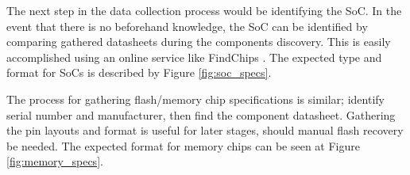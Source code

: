 






The next step in the data collection process would be identifying the SoC. In the event that there is no beforehand knowledge, the SoC can be identified by comparing gathered datasheets during the components discovery. This is easily accomplished using an online service like FindChips \autocite{FindchipsElectronicPart}. The expected type and format for SoCs is described by Figure \ref{fig:soc_specs}.

The process for gathering flash/memory chip specifications is similar; identify serial number and manufacturer, then find the component datasheet. Gathering the pin layouts and format is useful for later stages, should manual flash recovery be needed. The expected format for memory chips can be seen at Figure \ref{fig:memory_specs}.

